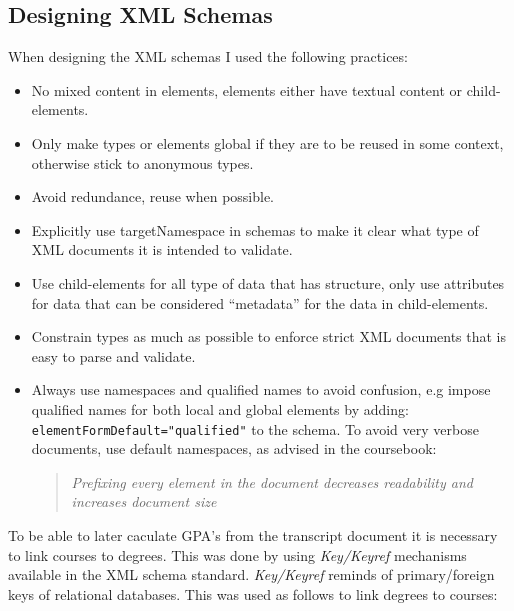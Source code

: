 \documentclass[a4paper, 11pt]{article}
\begin{document}
\subsection*{Designing XML Schemas}
When designing the XML schemas I used the following practices:
\begin{itemize}
\item No mixed content in elements, elements either have textual content or child-elements.
\item Only make types or elements global if they are to be reused in some context, otherwise stick to anonymous types.
\item Avoid redundance, reuse when possible.
\item Explicitly use targetNamespace in schemas to make it clear what type of XML documents it is intended to validate.
\item Use child-elements for all type of data that has structure, only use attributes for data that can be considered ``metadata'' for the data in child-elements.
\item Constrain types as much as possible to enforce strict XML documents that is easy to parse and validate.
\item Always use namespaces and qualified names to avoid confusion, e.g impose qualified names for  both local and global elements by  adding: \texttt{elementFormDefault="qualified"} to the schema. To avoid very verbose documents, use default namespaces, as advised in the coursebook:
  \begin{quote}
    \textit{Prefixing every element in the document decreases readability and increases document size}\citep{coursebook}
  \end{quote}
\end{itemize}

To be able to later caculate GPA's from the transcript document it is necessary to link courses to degrees. This was done by using \textit{Key/Keyref} mechanisms available in the XML schema standard. \textit{Key/Keyref} reminds of primary/foreign keys of relational databases. This was used as follows to link degrees to courses:
\end{document}
